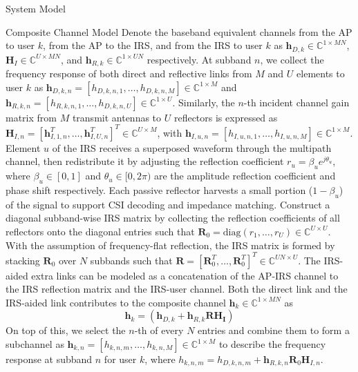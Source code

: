 \documentclass{IEEEtran}
\begin{document}
\begin{section} {System Model}
\begin{subsection}	{Composite Channel Model}
		Denote the baseband equivalent channels from the AP to user $k$, from the AP to the IRS, and from the IRS to user $k$ as $\boldsymbol{h}_{D,k} \in \mathbb{C}^{1 \times MN}$, $\boldsymbol{H}_I \in \mathbb{C}^{U \times MN}$, and $\boldsymbol{h}_{R,k} \in \mathbb{C}^{1 \times UN}$ respectively. At subband $n$, we collect the frequency response of both direct and reflective links from $M$ and $U$ elements to user $k$ as $\boldsymbol{h}_{D,k,n}=[h_{D,k,n,1},\dots,h_{D,k,n,M}] \in \mathbb{C}^{1 \times M}$ and $\boldsymbol{h}_{R,k,n}=[h_{R,k,n,1},\dots,h_{D,k,n,U}] \in \mathbb{C}^{1 \times U}$. Similarly, the $n$-th incident channel gain matrix from $M$ transmit antennas to $U$ reflectors is expressed as $\boldsymbol{H}_{I,n}=[\boldsymbol{h}_{I,1,n}^T,\dots,\boldsymbol{h}_{I,U,n}^T]^T \in \mathbb{C}^{U \times M}$, with $\boldsymbol{h}_{I,u,n}=[h_{I,u,n,1},\dots,h_{I,u,n,M}] \in \mathbb{C}^{1 \times M}$. Element $u$ of the IRS receives a superposed waveform through the multipath channel, then redistribute it by adjusting the reflection coefficient $r_u = \beta_u e^{j \theta_u}$, where $\beta_u \in [0,1]$ and $\theta_u \in [0,2\pi)$ are the amplitude reflection coefficient and phase shift respectively. Each passive reflector harvests a small portion ($1 - \beta_u$) of the signal to support CSI decoding and impedance matching. Construct a diagonal subband-wise IRS matrix by collecting the reflection coefficients of all reflectors onto the diagonal entries such that $\boldsymbol{R}_0 = \text{diag}(r_1, \dots, r_U) \in \mathbb{C}^{U \times U}$. With the assumption of frequency-flat reflection, the IRS matrix is formed by stacking $\boldsymbol{R}_0$ over $N$ subbands such that $\boldsymbol{R} = [\boldsymbol{R}_0^T,\dots,\boldsymbol{R}_0^T]^T \in \mathbb{C}^{UN \times U}$. The IRS-aided extra links can be modeled as a concatenation of the AP-IRS channel to the IRS reflection matrix and the IRS-user channel. Both the direct link and the IRS-aided link contributes to the composite channel $\boldsymbol{h}_k \in \mathbb{C}^{1 \times MN}$ as
		\begin{equation}	\label{eq:h_k}
			\boldsymbol{h}_k = \left( \boldsymbol{h}_{D,k}+\boldsymbol{h}_{R,k} \boldsymbol{R} \boldsymbol{\boldsymbol{H}_I} \right)
		\end{equation}
		On top of this, we select the $n$-th of every $N$ entries and combine them to form a subchannel as $\boldsymbol{h}_{k,n}=[h_{k,n,m},\dots,h_{k,n,M}] \in \mathbb{C}^{1 \times M}$ to describe the frequency response at subband $n$ for user $k$, where $h_{k,n,m}=h_{D,k,n,m}+\boldsymbol{h}_{R,k,n}\boldsymbol{R}_0\boldsymbol{H}_{I,n}$.
	\end{subsection}


\end{section}
\end{document}
